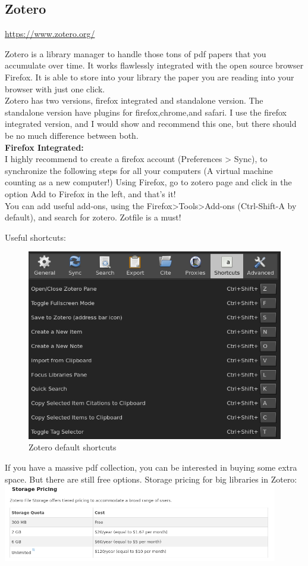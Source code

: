 \documentclass[a4paper]{article}
\begin{document}
\subsection{Zotero}
\url{https://www.zotero.org/}

Zotero is a library manager to handle those tons of pdf papers that you accumulate over time. It works flawlessly integrated with the open source browser Firefox. It is able to store into your library the paper you are reading into your browser with just one click.\\

Zotero has two versions, firefox integrated and standalone version. The standalone version have plugins for firefox,chrome,and safari. I use the firefox integrated version, and I would show and recommend this one, but there should be no much difference between both.\\

\textbf{Firefox Integrated:}\\
I highly recommend to create a firefox account (Preferences > Sync), to synchronize the following steps for all your computers (A virtual machine counting as a new computer!)
Using Firefox, go to zotero page and click in the option Add to Firefox in the left, and that's it!\\
You can add useful add-ons, using the Firefox>Tools>Add-ons (Ctrl-Shift-A by default), and search for zotero. Zotfile is a must!

Useful shortcuts:\\
\begin{figure}[H]
    \centering
    \includegraphics[width=0.5\linewidth]{zotero_shortcuts.png}
    \caption{Zotero default shortcuts}
    \label{fig:zotero_shortcuts}
\end{figure}

If you have a massive pdf collection, you can be interested in buying some extra space. But there are still free options. Storage pricing for big libraries in Zotero:\\
\includegraphics[width=0.9\textwidth]{zotero_price.png} \\
\end{document}
